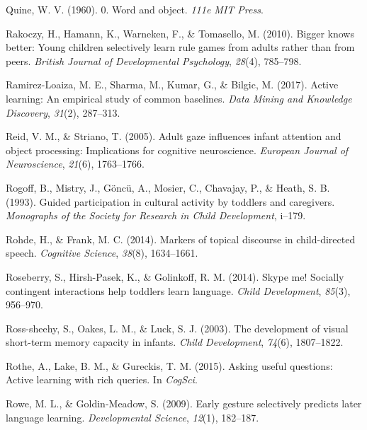 \documentclass[oneside]{report}
\begin{document}
\leavevmode\hypertarget{ref-quine19600}{}%
Quine, W. V. (1960). 0. Word and object. \emph{111e MIT Press}.

\leavevmode\hypertarget{ref-rakoczy2010bigger}{}%
Rakoczy, H., Hamann, K., Warneken, F., \& Tomasello, M. (2010). Bigger
knows better: Young children selectively learn rule games from adults
rather than from peers. \emph{British Journal of Developmental
Psychology}, \emph{28}(4), 785--798.

\leavevmode\hypertarget{ref-ramirez2017active}{}%
Ramirez-Loaiza, M. E., Sharma, M., Kumar, G., \& Bilgic, M. (2017).
Active learning: An empirical study of common baselines. \emph{Data
Mining and Knowledge Discovery}, \emph{31}(2), 287--313.

\leavevmode\hypertarget{ref-reid2005adult}{}%
Reid, V. M., \& Striano, T. (2005). Adult gaze influences infant
attention and object processing: Implications for cognitive
neuroscience. \emph{European Journal of Neuroscience}, \emph{21}(6),
1763--1766.

\leavevmode\hypertarget{ref-rogoff1993guided}{}%
Rogoff, B., Mistry, J., Göncü, A., Mosier, C., Chavajay, P., \& Heath,
S. B. (1993). Guided participation in cultural activity by toddlers and
caregivers. \emph{Monographs of the Society for Research in Child
Development}, i--179.

\leavevmode\hypertarget{ref-rohde2014markers}{}%
Rohde, H., \& Frank, M. C. (2014). Markers of topical discourse in
child-directed speech. \emph{Cognitive Science}, \emph{38}(8),
1634--1661.

\leavevmode\hypertarget{ref-roseberry2014skype}{}%
Roseberry, S., Hirsh-Pasek, K., \& Golinkoff, R. M. (2014). Skype me!
Socially contingent interactions help toddlers learn language.
\emph{Child Development}, \emph{85}(3), 956--970.

\leavevmode\hypertarget{ref-ross2003development}{}%
Ross-sheehy, S., Oakes, L. M., \& Luck, S. J. (2003). The development of
visual short-term memory capacity in infants. \emph{Child Development},
\emph{74}(6), 1807--1822.

\leavevmode\hypertarget{ref-rothe2015asking}{}%
Rothe, A., Lake, B. M., \& Gureckis, T. M. (2015). Asking useful
questions: Active learning with rich queries. In \emph{CogSci}.

\leavevmode\hypertarget{ref-rowe2009early}{}%
Rowe, M. L., \& Goldin-Meadow, S. (2009). Early gesture selectively
predicts later language learning. \emph{Developmental Science},
\emph{12}(1), 182--187.
\end{document}
